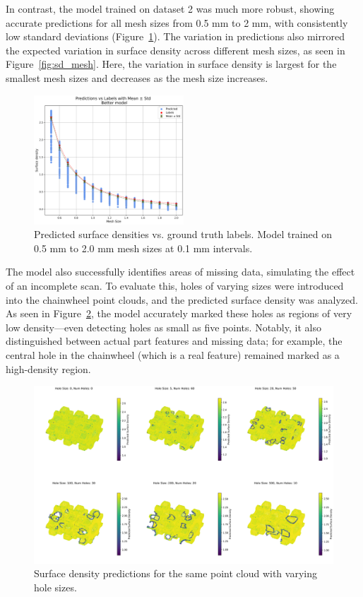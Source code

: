 In contrast, the model trained on dataset 2 was much more robust, showing accurate predictions for all mesh sizes from 0.5 mm to 2 mm, with consistently low standard deviations (Figure~\ref{fig:pred_vs_label_better}). The variation in predictions also mirrored the expected variation in surface density across different mesh sizes, as seen in Figure~\ref{fig:sd_mesh}. Here, the variation in surface density is largest for the smallest mesh sizes and decreases as the mesh size increases.

\begin{figure}[H]
\centering
\includegraphics[width=0.5\textwidth]{figures/predict_vs_label_better_lowQ.png}
\caption{Predicted surface densities vs. ground truth labels. Model trained on 0.5 mm to 2.0 mm mesh sizes at 0.1 mm intervals.}
\label{fig:pred_vs_label_better}
\end{figure}

The model also successfully identifies areas of missing data, simulating the effect of an incomplete scan. To evaluate this, holes of varying sizes were introduced into the chainwheel point clouds, and the predicted surface density was analyzed. As seen in Figure~\ref{fig:holes_predict}, the model accurately marked these holes as regions of very low density—even detecting holes as small as five points. Notably, it also distinguished between actual part features and missing data; for example, the central hole in the chainwheel (which is a real feature) remained marked as a high-density region.

\begin{figure}[t]
\centering
\includegraphics[width=\textwidth]{figures/result3_lowQ.png}
\caption{Surface density predictions for the same point cloud with varying hole sizes.}
\label{fig:holes_predict}
\end{figure}

